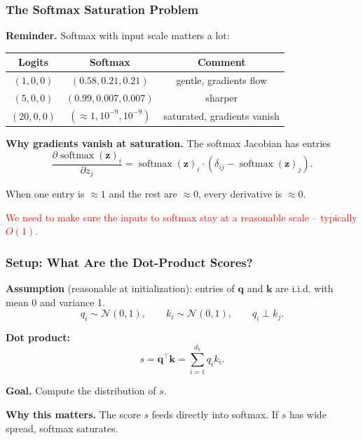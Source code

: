 \documentclass[notes,11pt, aspectratio=169]{beamer}
\DeclareMathOperator{\softmax}{softmax}
\newcommand{\vk}{\mathbf{k}}
\newcommand{\vq}{\mathbf{q}}
\newcommand{\vz}{\mathbf{z}}
\begin{document}
\begin{frame}
\frametitle{The Softmax Saturation Problem}

\textbf{Reminder.} Softmax with input scale matters a lot:

\vspace{6pt}
\begin{center}
\renewcommand{\arraystretch}{1.3}
\small
\begin{tabular}{c c c}
\toprule
\textbf{Logits} & \textbf{Softmax} & \textbf{Comment} \\
\midrule
$(1, 0, 0)$ & $(0.58, 0.21, 0.21)$ & gentle, gradients flow \\
$(5, 0, 0)$ & $(0.99, 0.007, 0.007)$ & sharper \\
$(20, 0, 0)$ & $(\approx 1, 10^{-9}, 10^{-9})$ & saturated, gradients vanish \\
\bottomrule
\end{tabular}
\end{center}

\vspace{10pt}
\textbf{Why gradients vanish at saturation.} The softmax Jacobian has entries
\[
    \frac{\partial \softmax(\vz)_i}{\partial z_j} = \softmax(\vz)_i \cdot (\delta_{ij} - \softmax(\vz)_j).
\]

When one entry is $\approx 1$ and the rest are $\approx 0$, every derivative is $\approx 0$.

\vspace{6pt}
\textcolor{red}{We need to make sure the inputs to softmax stay at a reasonable scale -- typically $O(1)$.}
\end{frame}

\begin{frame}
\frametitle{Setup: What Are the Dot-Product Scores?}

\textbf{Assumption} (reasonable at initialization): entries of $\vq$ and $\vk$ are i.i.d. with mean 0 and variance 1.
\[
    q_i \sim \mathcal{N}(0, 1), \qquad k_i \sim \mathcal{N}(0, 1), \qquad q_i \perp k_j.
\]

\vspace{8pt}
\textbf{Dot product:}
\[
    s = \vq^\top \vk = \sum_{i=1}^{d_k} q_i k_i.
\]

\vspace{8pt}
\textbf{Goal.} Compute the distribution of $s$.

\vspace{6pt}
\textbf{Why this matters.} The score $s$ feeds directly into softmax. If $s$ has wide spread, softmax saturates.
\end{frame}
\end{document}
